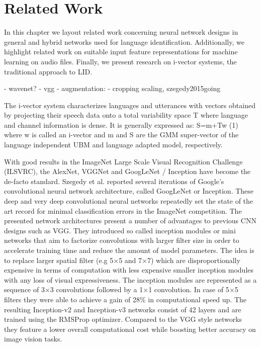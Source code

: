 \section{Related Work}
\label{sec:related_work}
In this chapter we layout related work concerning neural network designs in general and hybrid networks used for language identification. Additionally, we highlight related work on suitable input feature representations for machine learning on audio files. Finally, we present research on i-vector systems, the traditional approach to LID. 

- wavenet?
- vgg
- augmentation:
	- cropping scaling, {szegedy2015going}
	
	
The i-vector system characterizes languages and utterances with vectors obtained by projecting their speech data onto a total variability space T where language and channel information
is dense. It is generally expressed as:
S=m+Tw (1)
where w is called an i-vector and m and S are the GMM super-vector of the language independent UBM and language adapted model, respectively.


With good results in the ImageNet Large Scale Visual Recognition Challenge (ILSVRC)\cite{ILSVRC15}, the AlexNet\cite{krizhevsky2012imagenet}, VGGNet\cite{simonyan2014very} and GoogLeNet / Inception\cite{szegedy2015going} have become the de-facto standard. 
Szegedy et al. reported several iterations of Google's convolutional neural network architecture, called GoogLeNet or Inception\cite{szegedy2015going, szegedy2016rethinking, szegedy2016inception}. These deep and very deep convolutional neural networks repeatedly set the state of the art record for minimal classification errors in the ImageNet competition. The presented network architectures present a number of advantages to previous CNN designs such as VGG. They introduced so called inception modules or mini networks that aim to factorize convolutions with larger filter size in order to accelerate training time and reduce the amount of model parameters. The idea is to replace larger spatial filter (e.g 5$\times$5 and 7$\times$7) which are disproportionally expensive in terms of computation with less expensive smaller inception modules with any loss of visual expressiveness. The inception modules are represented as a sequence of 3$\times$3 convolutions followed by a 1$\times$1 convolution. In case of 5$\times$5 filters they were able to achieve a gain of 28\% in computational speed up. The resulting Inception-v2 and Inception-v3 networks consist of 42 layers and are trained using the RMSProp\cite{tieleman2012lecture} optimizer. Compared to the VGG style networks they feature a lower overall computational cost while boosting better accuracy on image vision tasks.

